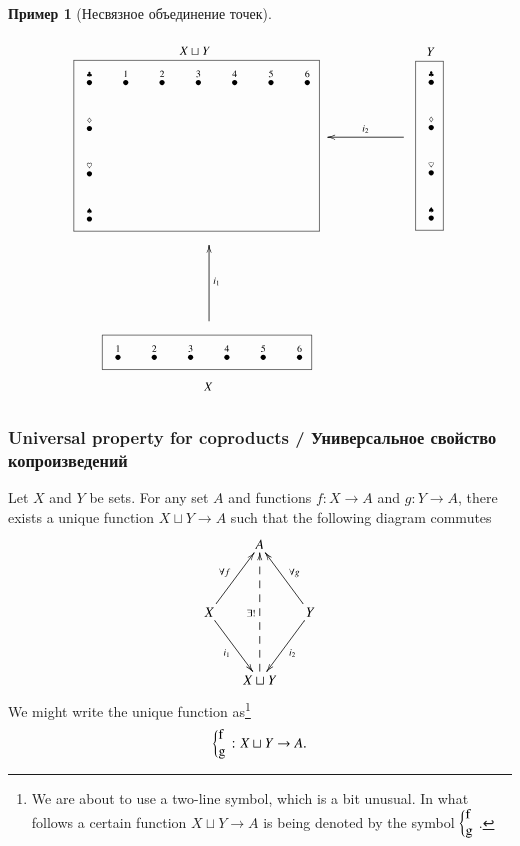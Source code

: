 \documentclass[a4paper]{book}
\def\to{\rightarrow}
\def\taking{\colon}
\newcommand{\LMO}[1]{\stackrel{#1}{\bullet}}
\newcommand{\coprodmap}[2]{{\left\{\parbox{.1in}{#1\\#2}\right.}}
\theoremstyle{myth}
\newtheorem{lemmaENG}[envENG]{\begin{english}Lemma\end{english}}
\newtheorem{exampleRUS}[envRUS]{Пример}
\begin{document}
\begin{russian}
\begin{exampleRUS}[Несвязное объединение точек]\label{ex:coprod of dots}
\begin{align}
\parbox{2.4in}{\begin{center}\small $X\sqcup Y$\vspace{-.1in}\end{center}\fbox{
\xymatrix@=15pt{
\LMO{\clubsuit}&\LMO{1}&\LMO{2}&\LMO{3}&\LMO{4}&\LMO{5}&\LMO{6}\\\LMO{\diamondsuit}\\\LMO{\heartsuit}\\\LMO{\spadesuit}
}}}
\parbox{.9in}{
\xymatrix{~&&\ar[ll]_{i_2}~}
}
\parbox{.3in}{\begin{center}\small $Y$\vspace{-.1in}\end{center}\fbox{
\xymatrix@=15pt{
\LMO{\clubsuit}\\\LMO{\diamondsuit}\\\LMO{\heartsuit}\\\LMO{\spadesuit}
}}}
\\\nonumber
\parbox{1in}{\hspace{-1.4in}\xymatrix{~\\\\\ar[uu]_{i_1}}}
\\\nonumber
\parbox{2.1in}{\hspace{-1.3in}\fbox{
\xymatrix@=15pt{
\LMO{1}&\LMO{2}&\LMO{3}&\LMO{4}&\LMO{5}&\LMO{6}
}}\begin{center}\hspace{-2.6in}\small$X$\end{center}}
\end{align}
\end{exampleRUS}


\subsubsection{Universal property for coproducts / Универсальное свойство копроизведений}

\begin{lemmaENG}\label{lemma:up for coprod}
Let $X$ and $Y$ be sets. For any set $A$ and functions $f\taking X\to A$ and $g\taking Y\to A$, there exists a unique function $X\sqcup Y\to A$ such that the following diagram commutes
$$
\xymatrix@=15pt{&A\\\\X\ar[uur]^{\forall f}\ar[ddr]_{i_1}&&Y\ar[uul]_{\forall g}\ar[ddl]^{i_2}\\\\&X\sqcup Y\ar@{-->}[uuuu]^{\exists!}}
$$
We might write the unique function as\footnote{We are about to use a two-line symbol, which is a bit unusual. In what follows a certain function $X\sqcup Y\to A$ is being denoted by the symbol $\coprodmap{f}{g}$.}
$$\coprodmap{f}{g}\taking X\sqcup Y\to A.$$
\end{lemmaENG}


\end{russian}
\end{document}
